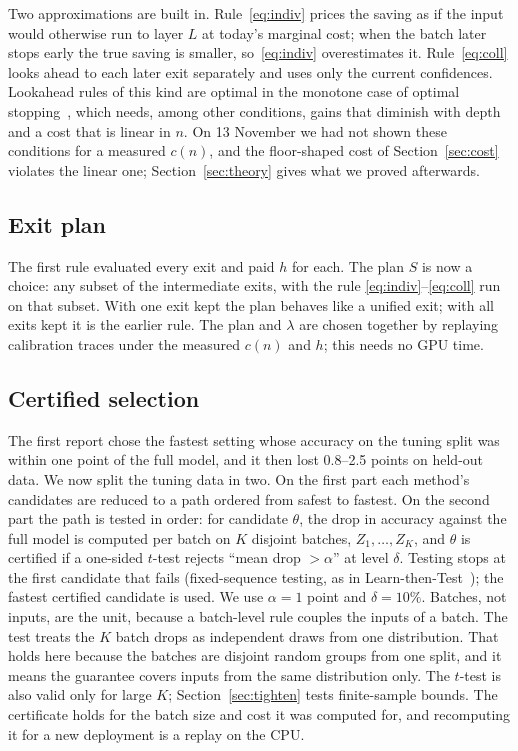 Two approximations are built in. Rule~\eqref{eq:indiv} prices the saving as if the input would otherwise run to
layer $L$ at today's marginal cost; when the batch later stops early the true saving is smaller, so~\eqref{eq:indiv}
overestimates it. Rule~\eqref{eq:coll} looks ahead to each later exit separately and uses only the current
confidences. Lookahead rules of this kind are optimal in the monotone case of optimal stopping~\cite{chow}, which
needs, among other conditions, gains that diminish with depth and a cost that is linear in $n$. On 13 November we
had not shown these conditions for a measured $c(n)$, and the floor-shaped cost of Section~\ref{sec:cost} violates
the linear one; Section~\ref{sec:theory} gives what we proved afterwards.

\subsection{Exit plan}\label{sec:plan}
The first rule evaluated every exit and paid $h$ for each. The plan $S$ is now a choice: any subset of the
intermediate exits, with the rule \eqref{eq:indiv}--\eqref{eq:coll} run on that subset. With one exit kept the plan
behaves like a unified exit; with all exits kept it is the earlier rule. The plan and $\lambda$ are chosen together
by replaying calibration traces under the measured $c(n)$ and $h$; this needs no GPU time.

\subsection{Certified selection}\label{sec:cert}
The first report chose the fastest setting whose accuracy on the tuning split was within one point of the full
model, and it then lost 0.8--2.5 points on held-out data. We now split the tuning data in two. On the first part each
method's candidates are reduced to a path ordered from safest to fastest. On the second part the path is tested in
order: for candidate $\theta$, the drop in accuracy against the full model is computed per batch on $K$ disjoint
batches, $Z_1,\dots,Z_K$, and $\theta$ is certified if a one-sided $t$-test rejects ``mean drop $>\alpha$'' at
level $\delta$. Testing stops at the first candidate that fails (fixed-sequence testing, as in
Learn-then-Test~\cite{ltt}); the fastest certified candidate is used. We use $\alpha=1$ point and $\delta=10\%$.
Batches, not inputs, are the unit, because a batch-level rule couples the inputs of a batch. The test treats the $K$
batch drops as independent draws from one distribution. That holds here because the batches are disjoint random
groups from one split, and it means the guarantee covers inputs from the same distribution only. The $t$-test is
also valid only for large $K$; Section~\ref{sec:tighten} tests finite-sample bounds. The certificate holds for the
batch size and cost it was computed for, and recomputing it for a new deployment is a replay on the CPU.

